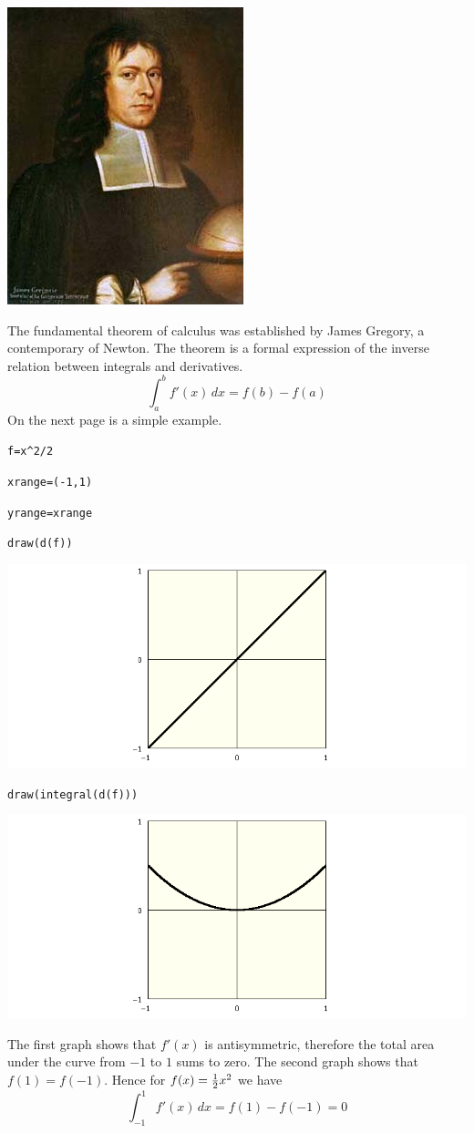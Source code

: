 \newpage

\begin{center}
\includegraphics[scale=0.5]{JamesGregory.jpeg}
\end{center}

\bigskip

\noindent
The fundamental theorem of calculus was established by James Gregory,
a contemporary of Newton.
The theorem is a formal expression of the inverse relation between
integrals and derivatives.
$$\int_a^b f'(x)\,dx=f(b)-f(a)$$
On the next page is a simple example.

\newpage

\verb$f=x^2/2$

\verb$xrange=(-1,1)$

\verb$yrange=xrange$

\verb$draw(d(f))$

\noindent
\includegraphics[scale=0.5]{funda1.png}

\verb$draw(integral(d(f)))$

\medskip
\noindent
\includegraphics[scale=0.5]{funda2.png}

\medskip
\noindent
The first graph shows that $f'(x)$ is antisymmetric, therefore the total
area under the curve from $-1$ to $1$ sums to zero.
The second graph shows that $f(1)=f(-1)$.
Hence for $f(x)={1\over2}x^2$ we have
$$\int_{-1}^1f'(x)\,dx=f(1)-f(-1)=0$$

